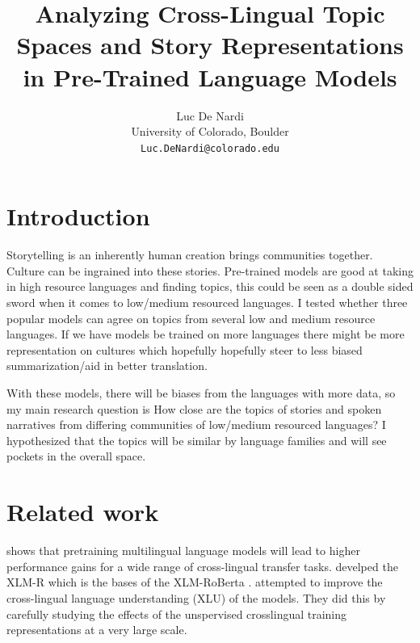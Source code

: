 \documentclass[11pt]{article} %
\title{Analyzing Cross-Lingual Topic Spaces and Story Representations in Pre-Trained
Language Models}
\author{Luc De Nardi \\ University of Colorado, Boulder \\ \texttt{Luc.DeNardi@colorado.edu}}
\begin{document}
    \maketitle



    \section{Introduction}
    Storytelling is an inherently human creation brings communities together. Culture
    can be ingrained into these stories. Pre-trained models are good at taking
    in high resource languages and finding topics, this could be seen as a double
    sided sword when it comes to low/medium resourced languages. I tested
    whether three popular models can agree on topics from several low and medium
    resource languages. If we have models be trained on more languages there might
    be more representation on cultures which hopefully hopefully steer to less biased
    summarization/aid in better translation.

    With these models, there will be biases from the languages with more data, so
    my main research question is How close are the topics of stories and spoken narratives
    from differing communities of low/medium resourced languages? I hypothesized
    that the topics will be similar by language families and will see pockets in
    the overall space.

    \section{Related work}
    \citet{conneau2020emerging} shows that pretraining multilingual language models
    will lead to higher performance gains for a wide range of cross-lingual transfer
    tasks. \citet{conneau2020emerging} develped the XLM-R which is the bases of the
    XLM-RoBerta \citep{DBLP:journals/corr/abs-1911-02116}. \citet{conneau2020emerging}
    attempted to improve the cross-lingual language understanding (XLU) of the
    models. They did this by carefully studying the effects of the unspervised crosslingual
    training representations at a very large scale.
\end{document}
